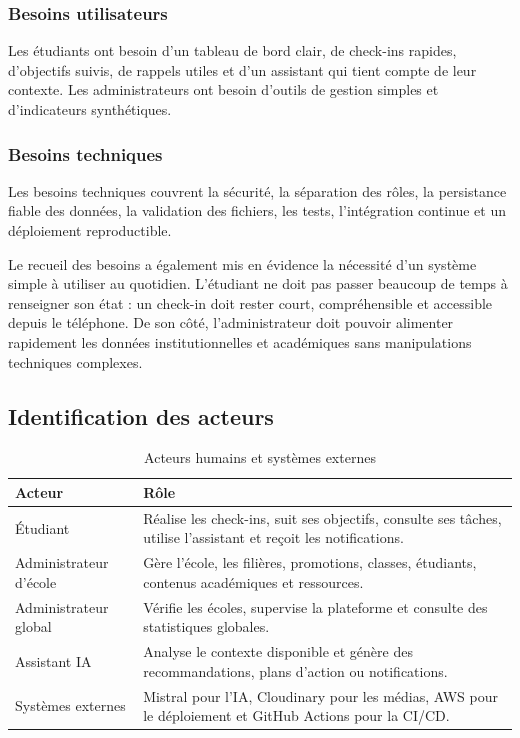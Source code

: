 \documentclass{rapportENSET}
\begin{document}
\subsubsection*{Besoins utilisateurs}
Les étudiants ont besoin d'un tableau de bord clair, de check-ins rapides, d'objectifs suivis, de rappels utiles et d'un assistant qui tient compte de leur contexte. Les administrateurs ont besoin d'outils de gestion simples et d'indicateurs synthétiques.

\subsubsection*{Besoins techniques}
Les besoins techniques couvrent la sécurité, la séparation des rôles, la persistance fiable des données, la validation des fichiers, les tests, l'intégration continue et un déploiement reproductible.

Le recueil des besoins a également mis en évidence la nécessité d'un système simple à utiliser au quotidien. L'étudiant ne doit pas passer beaucoup de temps à renseigner son état : un check-in doit rester court, compréhensible et accessible depuis le téléphone. De son côté, l'administrateur doit pouvoir alimenter rapidement les données institutionnelles et académiques sans manipulations techniques complexes.

\subsection{Identification des acteurs}
\begin{table}[H]
\centering
\begin{tabularx}{\textwidth}{@{}L{0.28\textwidth}Y@{}}
\toprule
\textbf{Acteur} & \textbf{Rôle} \\
\midrule
Étudiant & Réalise les check-ins, suit ses objectifs, consulte ses tâches, utilise l'assistant et reçoit les notifications. \\
Administrateur d'école & Gère l'école, les filières, promotions, classes, étudiants, contenus académiques et ressources. \\
Administrateur global & Vérifie les écoles, supervise la plateforme et consulte des statistiques globales. \\
Assistant IA & Analyse le contexte disponible et génère des recommandations, plans d'action ou notifications. \\
Systèmes externes & Mistral pour l'IA, Cloudinary pour les médias, AWS pour le déploiement et GitHub Actions pour la CI/CD. \\
\bottomrule
\end{tabularx}
\caption{Acteurs humains et systèmes externes}
\end{table}
\end{document}
